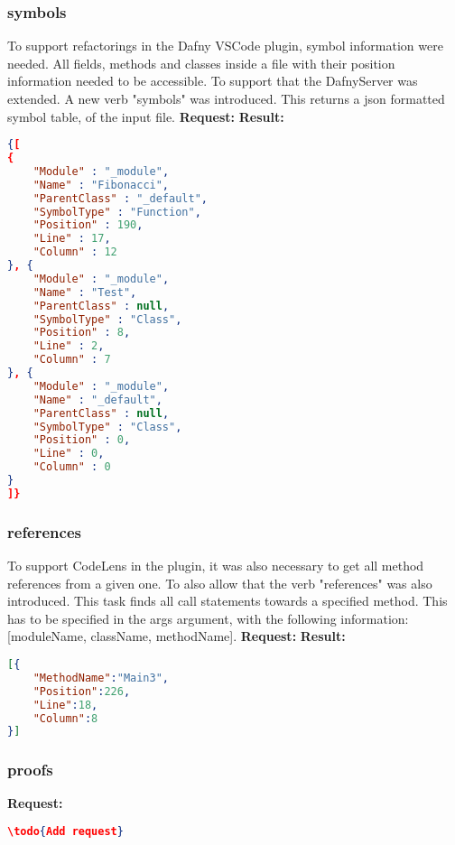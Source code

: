 \subsubsection{symbols}
To support refactorings in the Dafny VSCode plugin, symbol information were needed. All fields, methods and classes inside a file with their position information needed to be accessible. To support that the DafnyServer was extended. A new verb "symbols" was introduced. This returns a json formatted symbol table, of the input file. 
\newline\newline
\textbf{Request: }
\newline\newline
\textbf{Result: }
\begin{lstlisting}[language=json,firstnumber=1]
{[
{
	"Module" : "_module",
	"Name" : "Fibonacci",
	"ParentClass" : "_default",
	"SymbolType" : "Function",
	"Position" : 190,
	"Line" : 17,
	"Column" : 12
}, {
	"Module" : "_module",
	"Name" : "Test",
	"ParentClass" : null,
	"SymbolType" : "Class",
	"Position" : 8,
	"Line" : 2,
	"Column" : 7
}, {
	"Module" : "_module",
	"Name" : "_default",
	"ParentClass" : null,
	"SymbolType" : "Class",
	"Position" : 0,
	"Line" : 0,
	"Column" : 0
}
]}
\end{lstlisting}

\subsubsection{references}
To support CodeLens in the plugin, it was also necessary to get all method references from a given one. To also allow that the verb "references" was also introduced. This task finds all call statements towards a specified method. This has to be specified in the args argument, with the following information: [moduleName, className, methodName]. 
\newline\newline
\textbf{Request: }
\newline\newline
\textbf{Result: }
\begin{lstlisting}[language=json,firstnumber=1]
[{
	"MethodName":"Main3",
	"Position":226,
	"Line":18,
	"Column":8
}] 
\end{lstlisting}


\subsubsection{proofs}
\textbf{Request: }
\begin{lstlisting}[language=json,firstnumber=1]
\todo{Add request}
\end{lstlisting}

